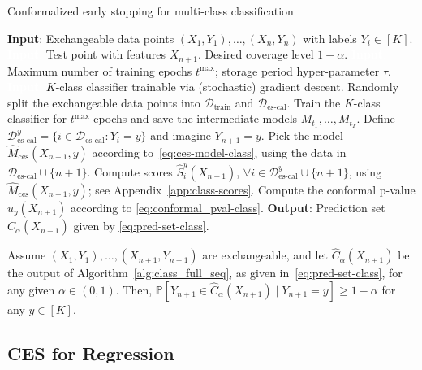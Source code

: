 \begin{algorithm}[H]
    \caption{Conformalized early stopping for multi-class classification}
    \label{alg:class_full_seq}
    \begin{algorithmic}[1]
        \STATE \textbf{Input}: Exchangeable data points $(X_{1},Y_{1}), \ldots, (X_{n},Y_{n})$ with labels $Y_i \in [K]$.
        \STATE \textcolor{white}{\textbf{Input}:} Test point with features $X_{n+1}$. Desired coverage level $1-\alpha$.
        \STATE \textcolor{white}{\textbf{Input}:} Maximum number of training epochs $t^{\text{max}}$; storage period hyper-parameter $\tau$.
        \STATE \textcolor{white}{\textbf{Input}:} $K$-class classifier trainable via (stochastic) gradient descent.
        \STATE Randomly split the exchangeable data points into $\mathcal{D}_{\text{train}}$ and $\mathcal{D}_{\text{es-cal}}$.
        \STATE Train the $K$-class classifier for $t^{\text{max}}$ epochs and save the intermediate models $M_{t_1} , \dots, M_{t_T}$.
        \STATE Define $\mathcal{D}^y_{\text{es-cal}} = \{i \in \mathcal{D}_{\text{es-cal}} : Y_i = y \}$ and imagine $Y_{n+1}=y$.
        \STATE Pick the model $\hat{M}_{\text{ces}}(X_{n+1},y)$ according to~\eqref{eq:ces-model-class}, using the data in $\mathcal{D}_{\text{es-cal}} \cup \{n+1\}$.
        \STATE Compute scores $\hat{S}_i^y(X_{n+1})$, $\forall i \in \mathcal{D}^y_{\text{es-cal}} \cup \{n+1\}$, using $\hat{M}_{\text{ces}}(X_{n+1},y)$; see Appendix~\ref{app:class-scores}.
        \STATE Compute the conformal p-value $\hat{u}_y(X_{n+1})$ according to \eqref{eq:conformal_pval-class}.
        \ENDFOR
        \STATE \textbf{Output}: Prediction set $\hat{C}_{\alpha}(X_{n+1})$ given by \eqref{eq:pred-set-class}.
    \end{algorithmic}
\end{algorithm}

\begin{theorem}\label{thm:class_full}
Assume $(X_{1},Y_{1}), \ldots, (X_{n+1},Y_{n+1})$ are exchangeable, and let $\hat{C}_{\alpha}(X_{n+1})$ be the output of Algorithm~\ref{alg:class_full_seq}, as given in~\eqref{eq:pred-set-class}, for any given $\alpha \in (0,1)$.
Then, $\mathbb{P}[Y_{n+1} \in \hat{C}_{\alpha}(X_{n+1}) \mid Y_{n+1} = y] \geq 1-\alpha$ for any $y \in [K]$.
\end{theorem}


\subsection{CES for Regression} \label{sec:regression}

